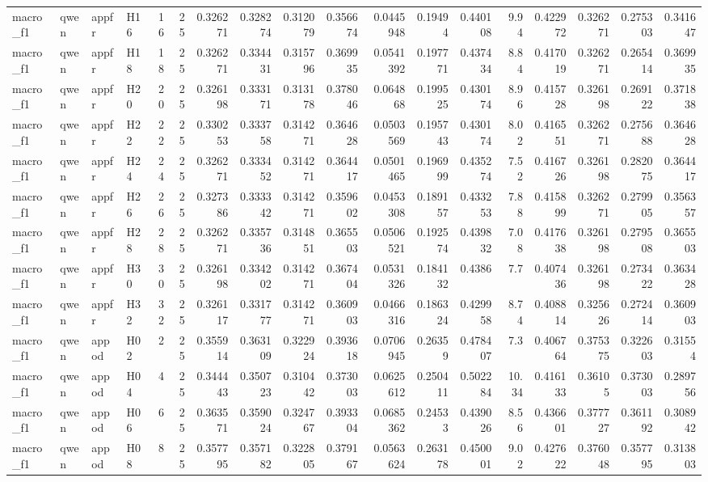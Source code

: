\begin{longtable}{llllrrrrrrrrrrrrrr}
macro\_f1 & qwen & appfr & H16 & 16 & 25 & 0.326271 & 0.328274 & 0.312079 & 0.356674 & 0.0445948 & 0.19494 & 0.440108 & 9.94 & 0.422972 & 0.326271 & 0.275303 & 0.341647 \\
macro\_f1 & qwen & appfr & H18 & 18 & 25 & 0.326271 & 0.334431 & 0.315796 & 0.369935 & 0.0541392 & 0.197771 & 0.437434 & 8.84 & 0.417019 & 0.326271 & 0.265414 & 0.369935 \\
macro\_f1 & qwen & appfr & H20 & 20 & 25 & 0.326198 & 0.333171 & 0.313178 & 0.378046 & 0.064868 & 0.199525 & 0.430174 & 8.96 & 0.415728 & 0.326198 & 0.269122 & 0.371838 \\
macro\_f1 & qwen & appfr & H22 & 22 & 25 & 0.330253 & 0.333758 & 0.314271 & 0.364628 & 0.0503569 & 0.195743 & 0.430174 & 8.02 & 0.416551 & 0.326271 & 0.275688 & 0.364628 \\
macro\_f1 & qwen & appfr & H24 & 24 & 25 & 0.326271 & 0.333452 & 0.314271 & 0.364417 & 0.0501465 & 0.196999 & 0.435274 & 7.52 & 0.416726 & 0.326198 & 0.282075 & 0.364417 \\
macro\_f1 & qwen & appfr & H26 & 26 & 25 & 0.327386 & 0.333342 & 0.314271 & 0.359602 & 0.0453308 & 0.189157 & 0.433253 & 7.88 & 0.415899 & 0.326271 & 0.279905 & 0.356357 \\
macro\_f1 & qwen & appfr & H28 & 28 & 25 & 0.326271 & 0.335736 & 0.314851 & 0.365503 & 0.0506521 & 0.192574 & 0.439832 & 7.08 & 0.417638 & 0.326198 & 0.279508 & 0.365503 \\
macro\_f1 & qwen & appfr & H30 & 30 & 25 & 0.326198 & 0.334202 & 0.314271 & 0.367404 & 0.0531326 & 0.184132 & 0.4386 & 7.7 & 0.407436 & 0.326198 & 0.273422 & 0.363428 \\
macro\_f1 & qwen & appfr & H32 & 32 & 25 & 0.326117 & 0.331777 & 0.314271 & 0.360903 & 0.0466316 & 0.186324 & 0.429958 & 8.74 & 0.408814 & 0.325626 & 0.272414 & 0.360903 \\
macro\_f1 & qwen & appod & H02 & 2 & 25 & 0.355914 & 0.363109 & 0.322924 & 0.393618 & 0.0706945 & 0.26359 & 0.478407 & 7.3 & 0.406764 & 0.375375 & 0.322603 & 0.31554 \\
macro\_f1 & qwen & appod & H04 & 4 & 25 & 0.344443 & 0.350723 & 0.310442 & 0.373003 & 0.0625612 & 0.250411 & 0.502284 & 10.34 & 0.416133 & 0.36105 & 0.373003 & 0.289756 \\
macro\_f1 & qwen & appod & H06 & 6 & 25 & 0.363571 & 0.359024 & 0.324767 & 0.393304 & 0.0685362 & 0.24533 & 0.439026 & 8.56 & 0.436601 & 0.377727 & 0.361192 & 0.308942 \\
macro\_f1 & qwen & appod & H08 & 8 & 25 & 0.357795 & 0.357182 & 0.322805 & 0.379167 & 0.0563624 & 0.263178 & 0.450001 & 9.02 & 0.427622 & 0.376048 & 0.357795 & 0.313803 \\

\end{longtable}
